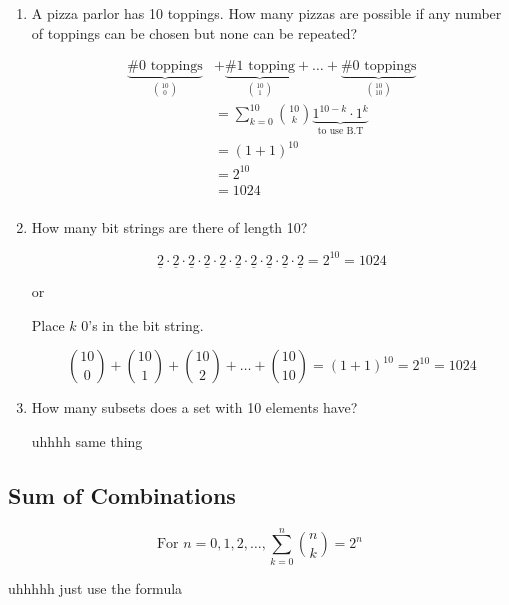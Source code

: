\documentclass[../../Main.tex]{subfiles}
\begin{document}
\begin{example}
    \begin{enumerate}
        \item 
        {
            A pizza parlor has 10 toppings. How many pizzas are possible if any number of toppings can be chosen but none can be repeated?

            \begin{align*}
                \underbrace{\text{\# 0 toppings}}_{10 \choose 0} &+
                \underbrace{\text{\# 1 topping}}_{10 \choose 1} +
                \ldots +
                \underbrace{\text{\# 0 toppings}}_{10 \choose 10} \\
                &= \sum_{k = 0}^{10} {10 \choose k} \underbrace{1^{10 - k} \cdot 1^k}_{\text{to use B.T}} \\
                &= (1 + 1)^{10} \\
                &= 2^{10} \\
                &= \boxed{1024} \\
            \end{align*}
        }

        \item
        {
            How many bit strings are there of length 10?

            $$\underline{2} \cdot \underline{2} \cdot \underline{2} \cdot \underline{2} \cdot \underline{2} \cdot \underline{2} \cdot \underline{2} \cdot \underline{2} \cdot \underline{2} \cdot \underline{2} = 2^{10} = \boxed{1024}$$

            or

            Place $k$ $0$'s in the bit string.

            $${10 \choose 0} + {10 \choose 1} + {10 \choose 2} + \ldots + {10 \choose 10} = (1 + 1)^{10} = 2^{10} = 1024$$
        }

        \item
        {
            How many subsets does a set with 10 elements have?

            uhhhh same thing
        }
    \end{enumerate}
\end{example}

\subsection{Sum of Combinations}

\begin{theorem}
    $$\text{For } n = 0, 1, 2, \ldots, \sum_{k = 0}^{n}{n \choose k} = 2^n$$
\end{theorem}

\begin{example}
    uhhhhh just use the formula
\end{example}

\end{document}
